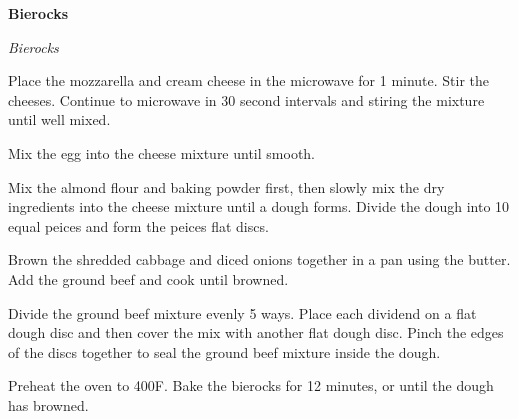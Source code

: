 \documentclass[../recipe-collections/cooking.tex]{subfiles}
\begin{document}
\begin{recipe}{\textbf{Bierocks}}{}{}

  \freeform{}\textit{Bierocks}

  
  Place the mozzarella and cream cheese in the microwave for 1 minute. Stir the cheeses. 
  Continue to microwave in 30 second intervals and stiring the mixture until well mixed.


  Mix the egg into the cheese mixture until smooth.

  
  Mix the almond flour and baking powder first, then slowly mix the dry ingredients
  into the cheese mixture until a dough forms. Divide the dough into 10 equal peices 
  and form the peices flat discs. 


  Brown the shredded cabbage and diced onions together in a pan using the butter.
  Add the ground beef and cook until browned.

  Divide the ground beef mixture evenly 5 ways. Place each dividend on a flat dough disc and 
  then cover the mix with another flat dough disc. Pinch the edges of the discs together
  to seal the ground beef mixture inside the dough.

  Preheat the oven to 400\0F. Bake the bierocks for 12 minutes, or until the dough has browned.

  \freeform{}\hrulefill{}

\end{recipe}
\end{document}
